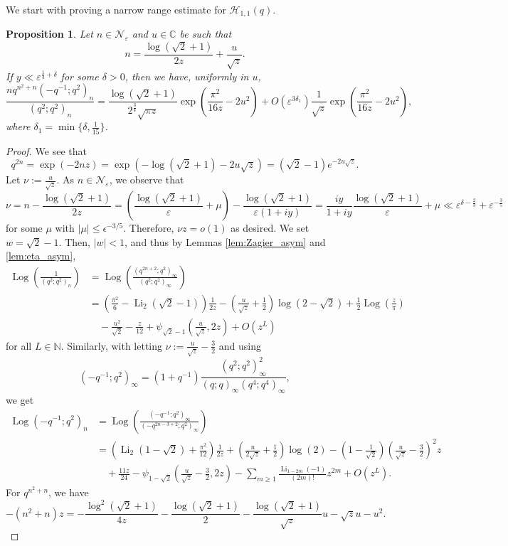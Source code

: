 \documentclass[11pt,reqno]{amsart}
\newtheorem{proposition}[theorem]{Proposition}
\theoremstyle{remark}
\numberwithin{equation}{section}
\def\Log{\operatorname{Log}}
\def\Li{\operatorname{Li}}
\def\Log{\operatorname{Log}}
\def\Li{\operatorname{Li}}
\begin{document}
We start with proving a narrow range estimate for $\mathcal{H}_{1,1}(q)$.
\begin{proposition}\label{prop:H_narrow}
	Let $n \in \mathcal{N}_{\varepsilon}$ and $u \in \mathbb{C}$ be such that
	\[
		n = \frac{\log(\sqrt{2}+1)}{2z} + \frac{u}{\sqrt{z}}.
	\]
	If $y \ll \varepsilon^{\frac13+\delta}$ for some $\delta>0$, then we have, uniformly in $u$,
	\[
		\frac{ n q^{n^2+n} (-q^{-1};q^2)_n}{(q^2;q^2)_n}  =  \frac{\log(\sqrt{2}+1) }{2^{\frac34}\sqrt{\pi z}}\exp \left( \frac{\pi^2}{16z} - 2  u^2   \right) + O\left( \varepsilon^{3\delta_1}\right) \frac{1}{\sqrt{z}} \exp \left( \frac{\pi^2}{16z} - 2u^2   \right),
	\]
	where $\delta_1=\min\{\delta, \frac{1}{15}\}$. 
\end{proposition}
\begin{proof}
We see that
\[
	q^{2n} = \exp \left( -2n  z \right) = \exp \left( - \log(\sqrt{2}+1) - 2u \sqrt{z}  \right) = (\sqrt{2}-1) e^{- 2u \sqrt{z}}.
\]
Let $\nu := \frac{u}{\sqrt{z}}$. As $n \in \mathcal{N}_{\varepsilon}$, we observe that
\[
	\nu = n - \frac{\log(\sqrt{2}+1)}{2z} = \left( \frac{\log(\sqrt{2}+1)}{\varepsilon} + \mu \right) - \frac{\log(\sqrt{2}+1)}{\varepsilon(1+i y)} = \frac{iy}{1+iy} \frac{\log(\sqrt{2}+1)}{\varepsilon} + \mu \ll \varepsilon^{\delta-\frac23} + \varepsilon^{-\frac35}
\]
for some $\mu$ with $|\mu|\le \epsilon^{-3/5}$.
Therefore, $\nu z = o(1)$ as desired.  We set $w = \sqrt{2}-1$. Then, $|w| <1$, and thus by Lemmas \ref{lem:Zagier_asym} and \ref{lem:eta_asym},
\begin{align*}
	\Log \left(\frac{1}{(q^2;q^2)_n}\right)&=\Log \left(\frac{(q^{2n+2};q^2)_\infty}{(q^2;q^2)_\infty} \right)
	\\
    &= \left(\frac{\pi^2}{6} - \Li_2 (\sqrt{2}-1)\right) \frac{1}{2z} -\left( \frac{u}{\sqrt{z}} + \frac{1}{2} \right) \log(2-\sqrt{2})
	+ \frac{1}{2} \Log\left(\frac{z}{\pi} \right) \\
    & \quad -\frac{u^2}{\sqrt{2}} - \frac{z}{12}
	+ \psi_{\sqrt{2}-1} \left(\frac{u}{\sqrt{z}}, 2z \right) + O\left(z^L\right)
\end{align*}
for all $L \in \mathbb{N}$.
Similarly, with letting $\nu:=\frac{u}{\sqrt{z}}-\frac32$ and using 
$$(-q^{-1};q^2)_\infty = (1+q^{-1}) \frac{(q^2;q^2)_\infty^2}{(q;q)_\infty (q^4;q^4)_\infty},$$
we get
\begin{align*}
	\Log (-q^{-1};q^2)_n &=\Log \left(\frac{(-q^{-1};q^2)_\infty}{(-q^{2n-3+2};q^2)_\infty} \right) \\
	& = \left( \Li_2 (1-\sqrt{2}) +\frac{\pi^2}{12}\right) \frac{1}{2z} + \left( \frac{u}{2\sqrt{z}} + \frac12 \right) \log(2) 
	  -\left(1-\frac1{\sqrt 2}\right)\! \left(\frac{u}{\sqrt{z}}-\frac32\right)^2\! z \\
      &
	\quad + \frac{11z}{24}- \psi_{1-\sqrt{2}} \left(\frac{u}{\sqrt{z}}-\frac32, 2z \right) -\sum_{m \geq 1} \frac{\Li_{1-2m}(-1)}{(2m)!} z^{2m} + O\left(z^L\right). 
\end{align*}
For $q^{n^2+n}$, we have
\[
	-(n^2 +n) z = - \frac{\log^2 (\sqrt{2}+1)}{4z} -\frac{\log(\sqrt{2}+1)}{2}  - \frac{\log (\sqrt{2}+1)}{\sqrt{z}}u -\sqrt{z}u  - u^2.
\]


\end{proof}
\end{document}
